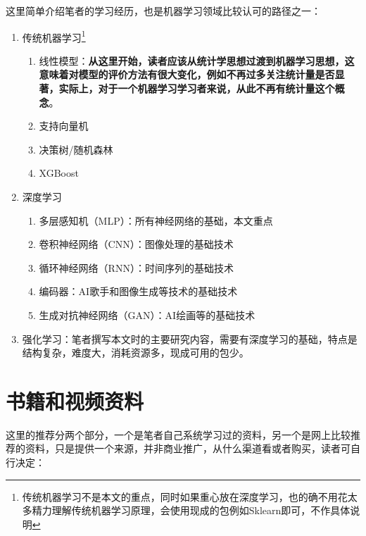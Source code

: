 \documentclass[a5paper, 11pt, openany]{book}
\begin{document}
这里简单介绍笔者的学习经历，也是机器学习领域比较认可的路径之一\label{route}：
\begin{enumerate}
    \item 传统机器学习\footnote{传统机器学习不是本文的重点，同时如果重心放在深度学习，也的确不用花太多精力理解传统机器学习原理，会使用现成的包例如Sklearn即可，不作具体说明}
        \begin{enumerate}
            \item 线性模型：\textbf{从这里开始，读者应该从统计学思想过渡到机器学习思想，这意味着对模型的评价方法有很大变化，例如不再过多关注统计量是否显著，实际上，对于一个机器学习学习者来说，从此不再有统计量这个概念}。
            \item 支持向量机
            \item 决策树/随机森林
            \item XGBoost
        \end{enumerate}
    \item 深度学习
        \begin{enumerate}
            \item 多层感知机（MLP）：所有神经网络的基础，本文重点
            \item 卷积神经网络（CNN）：图像处理的基础技术
            \item 循环神经网络（RNN）：时间序列的基础技术
            \item 编码器：AI歌手和图像生成等技术的基础技术
            \item 生成对抗神经网络（GAN）：AI绘画等的基础技术
        \end{enumerate}
    \item 强化学习：笔者撰写本文时的主要研究内容，需要有深度学习的基础，特点是结构复杂，难度大，消耗资源多，现成可用的包少。
\end{enumerate}

\section{书籍和视频资料}
这里的推荐分两个部分，一个是笔者自己系统学习过的资料，另一个是网上比较推荐的资料，只是提供一个来源，并非商业推广，从什么渠道看或者购买，读者可自行决定：
\end{document}
